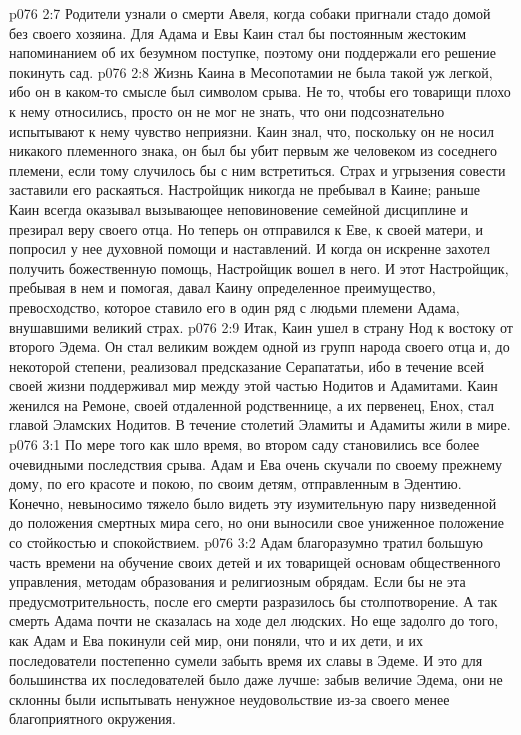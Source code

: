 \vs p076 2:7 \pc Родители узнали о смерти Авеля, когда собаки пригнали стадо домой без своего хозяина. Для Адама и Евы Каин стал бы постоянным жестоким напоминанием об их безумном поступке, поэтому они поддержали его решение покинуть сад.
\vs p076 2:8 Жизнь Каина в Месопотамии не была такой уж легкой, ибо он в каком\hyp{}то смысле был символом срыва. Не то, чтобы его товарищи плохо к нему относились, просто он не мог не знать, что они подсознательно испытывают к нему чувство неприязни. Каин знал, что, поскольку он не носил никакого племенного знака, он был бы убит первым же человеком из соседнего племени, если тому случилось бы с ним встретиться. Страх и угрызения совести заставили его раскаяться. Настройщик никогда не пребывал в Каине; раньше Каин всегда оказывал вызывающее неповиновение семейной дисциплине и презирал веру своего отца. Но теперь он отправился к Еве, к своей матери, и попросил у нее духовной помощи и наставлений. И когда он искренне захотел получить божественную помощь, Настройщик вошел в него. И этот Настройщик, пребывая в нем и помогая, давал Каину определенное преимущество, превосходство, которое ставило его в один ряд с людьми племени Адама, внушавшими великий страх.
\vs p076 2:9 Итак, Каин ушел в страну Нод к востоку от второго Эдема. Он стал великим вождем одной из групп народа своего отца и, до некоторой степени, реализовал предсказание Серапататьи, ибо в течение всей своей жизни поддерживал мир между этой частью Нодитов и Адамитами. Каин женился на Ремоне, своей отдаленной родственнице, а их первенец, Енох, стал главой Эламских Нодитов. В течение столетий Эламиты и Адамиты жили в мире.
\vs p076 3:1 По мере того как шло время, во втором саду становились все более очевидными последствия срыва. Адам и Ева очень скучали по своему прежнему дому, по его красоте и покою, по своим детям, отправленным в Эдентию. Конечно, невыносимо тяжело было видеть эту изумительную пару низведенной до положения смертных мира сего, но они выносили свое униженное положение со стойкостью и спокойствием.
\vs p076 3:2 Адам благоразумно тратил большую часть времени на обучение своих детей и их товарищей основам общественного управления, методам образования и религиозным обрядам. Если бы не эта предусмотрительность, после его смерти разразилось бы столпотворение. А так смерть Адама почти не сказалась на ходе дел людских. Но еще задолго до того, как Адам и Ева покинули сей мир, они поняли, что и их дети, и их последователи постепенно сумели забыть время их славы в Эдеме. И это для большинства их последователей было даже лучше: забыв величие Эдема, они не склонны были испытывать ненужное неудовольствие из\hyp{}за своего менее благоприятного окружения.
